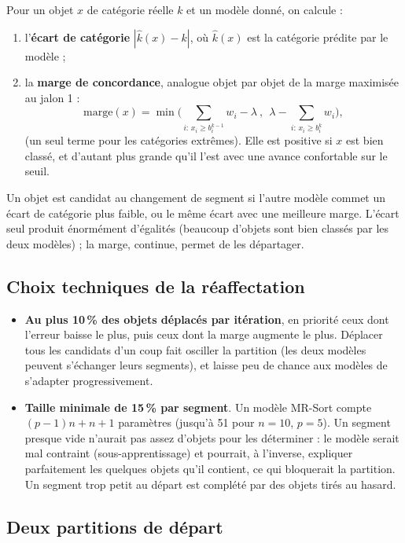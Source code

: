 \documentclass[11pt,a4paper]{article}
\begin{document}
Pour un objet $x$ de catégorie réelle $k$ et un modèle donné, on calcule :
\begin{enumerate}
  \item l'\textbf{écart de catégorie} $|\hat{k}(x)-k|$, où $\hat{k}(x)$ est la catégorie prédite par le modèle ;
  \item la \textbf{marge de concordance}, analogue objet par objet de la marge maximisée au jalon 1 :
  \[
    \text{marge}(x) = \min\Big(\sum_{i:\,x_i\ge b_i^{k-1}} w_i-\lambda\ ,\ \ \lambda-\sum_{i:\,x_i\ge b_i^{k}} w_i\Big),
  \]
  (un seul terme pour les catégories extrêmes). Elle est positive si $x$ est bien classé, et d'autant plus
  grande qu'il l'est avec une avance confortable sur le seuil.
\end{enumerate}
Un objet est candidat au changement de segment si l'autre modèle commet un écart de catégorie plus faible, ou
le même écart avec une meilleure marge. L'écart seul produit énormément d'égalités (beaucoup d'objets sont bien
classés par les deux modèles) ; la marge, continue, permet de les départager.

\subsection{Choix techniques de la réaffectation}

\begin{itemize}
  \item \textbf{Au plus 10\,\% des objets déplacés par itération}, en priorité ceux dont l'erreur baisse le plus,
        puis ceux dont la marge augmente le plus. Déplacer tous les candidats d'un coup fait osciller la
        partition (les deux modèles peuvent s'échanger leurs segments), et laisse peu de chance aux modèles de
        s'adapter progressivement.
  \item \textbf{Taille minimale de 15\,\% par segment}. Un modèle MR-Sort compte $(p-1)n+n+1$ paramètres
        (jusqu'à 51 pour $n=10$, $p=5$). Un segment presque vide n'aurait pas assez d'objets pour les déterminer :
        le modèle serait mal contraint (sous-apprentissage) et pourrait, à l'inverse, expliquer parfaitement
        les quelques objets qu'il contient, ce qui bloquerait la partition. Un segment trop petit au départ est
        complété par des objets tirés au hasard.
\end{itemize}

\subsection{Deux partitions de départ}
\end{document}
